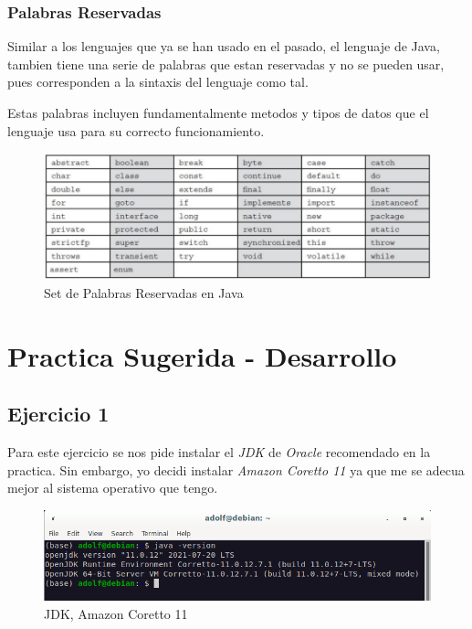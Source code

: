 \documentclass{article}
\begin{document}
		\subsubsection{Palabras Reservadas}
		
	 	Similar a los lenguajes que ya se han usado en el pasado, el lenguaje de Java, tambien tiene una serie de palabras que estan reservadas y no se pueden usar, pues corresponden a la sintaxis del lenguaje como tal.
	 	
	 	Estas palabras incluyen fundamentalmente metodos y tipos de datos que el lenguaje usa para su correcto funcionamiento.
	 	
	 	\begin{figure}[H]
	 		\centering
	 		\includegraphics[scale = 0.4]{images/words}
	 		\caption{Set de Palabras Reservadas en Java}
	 	\end{figure} 
 		\newpage
 	
 	\section{Practica Sugerida - Desarrollo}
 	
 		\subsection{Ejercicio 1}
 		
 		Para este ejercicio se nos pide instalar el \emph{JDK} de \emph{Oracle} recomendado en la practica. Sin embargo, yo decidi instalar \emph{Amazon Coretto 11} ya que me se adecua mejor al sistema operativo que tengo.
 		
 		\begin{figure}[H]
 			\centering
 			\includegraphics[scale = 0.6]{images/terminaljdk}
 			\caption{JDK, Amazon Coretto 11}
 		\end{figure} 
 	
\end{document}

